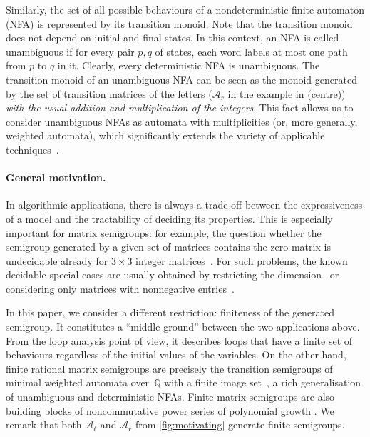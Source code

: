 \documentclass{lmcs}
\theoremstyle{definition}
\newcommand{\Aa}{\mathcal{A}}
\newcommand{\Q}{\mathbb{Q}}
\begin{document}
Similarly, the set of all possible behaviours of a nondeterministic finite automaton (NFA) is represented by its transition monoid. Note that the transition monoid does not depend on initial and final states. In this context, an NFA is called unambiguous if for every pair $p, q$ of states, each word labels at most one path from $p$ to $q$ in it. Clearly, every deterministic NFA is unambiguous. The transition monoid of an unambiguous NFA can be seen as the monoid generated by the set of transition matrices of the letters ($\Aa_r$ in the example in  (centre)) \emph{with the usual addition and multiplication of the integers}. This fact allows us to consider unambiguous NFAs as automata with multiplicities (or, more generally, weighted automata), which significantly extends the variety of applicable techniques~\cite{Kiefer2025}.


\paragraph*{General motivation.}

In algorithmic applications, there is always a trade-off between the expressiveness of a model and the tractability of deciding its properties. This is especially important for matrix semigroups: for example, the question whether the semigroup generated by a given set of matrices contains the zero matrix is undecidable already for $3 \times 3$ integer matrices~\cite{Paterson1970}. For such problems, the known decidable special cases are usually obtained by restricting the dimension~\cite{Cassaigne2014,Colcombet2019,Bell2021} or considering only matrices with nonnegative entries~\cite{Ryzhikov2024RP}.


In this paper, we consider a different restriction: finiteness of the generated semigroup. It constitutes a ``middle ground'' between the two applications above. From the loop analysis point of view, it describes loops that have a finite set of behaviours regardless of the initial values of the variables. On the other hand, finite rational matrix semigroups are precisely the transition semigroups of minimal weighted automata over~$\Q$ with a finite image set~\cite{Mandel1977},
a rich generalisation of unambiguous and deterministic NFAs. Finite matrix semigroups are also building blocks of noncommutative power series of polynomial growth \cite[Section~9.2]{Berstel2011}. We remark that both $\Aa_\ell$ and $\Aa_r$ from \cref{fig:motivating} generate finite semigroups.
\end{document}
